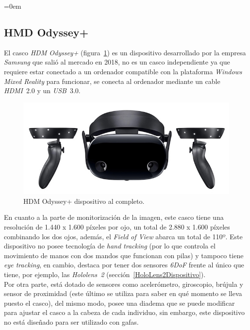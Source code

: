 \parindent=0em
\subsection{HMD Odyssey+}
\label{sec:odyssey}
\noindent


El casco \textit{HDM Odyssey+} (figura~\ref{fig:hdmOdysseyVista}) es un dispositivo desarrollado por la empresa \textit{Samsung} que salió al mercado en 2018, no es un casco independiente ya que requiere estar conectado a un ordenador compatible con la plataforma \textit{Windows Mixed Reality} para funcionar, se conecta al ordenador mediante un cable \textit{HDMI}~2.0 y un \textit{USB}~3.0.

\begin{figure}[h]
    \centering
    \includegraphics[scale=0.6]{Images/Estado del arte/samsungOdysseyplus.jpg}
    \caption{HDM Odyssey+ dispositivo al completo.}
    \label{fig:hdmOdysseyVista}
\end{figure}

En cuanto a la parte de monitorización de la imagen, este casco tiene una resolución de 1.440 x 1.600 píxeles por ojo, un total de 2.880 x 1.600 píxeles combinando los dos ojos, además, el \textit{Field of View} abarca un total de 110º. Este dispositivo no posee tecnología de \textit{hand tracking} (por lo que controla el movimiento de manos con dos mandos que funcionan con pilas) y tampoco tiene \textit{eye tracking}, en cambio, destaca por tener dos sensores \textit{6DoF} frente al único que tiene, por ejemplo, las \textit{Hololens~2} (sección~\ref{HoloLens2Dispositivo}).\\

Por otra parte, está dotado de sensores como acelerómetro, giroscopio, brújula y sensor de proximidad (este último se utiliza para saber en qué momento se lleva puesto el casco), del mismo modo, posee una diadema que se puede  modificar para ajustar el casco a la cabeza de cada individuo, sin embargo, este dispositivo no está diseñado para ser utilizado con gafas.\\ 

